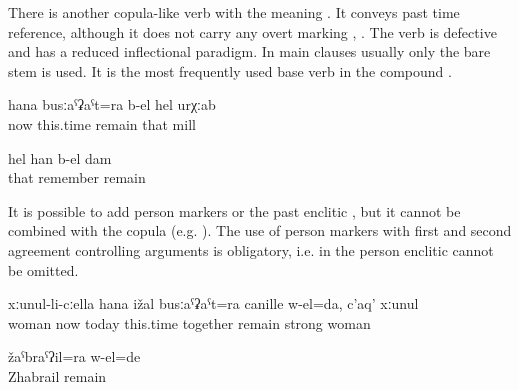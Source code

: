 There is another copula-like verb  with the meaning . It conveys past time reference, although it does not carry any overt marking , . The verb is defective and has a reduced inflectional paradigm. In main clauses usually only the bare stem is used. It is the most frequently used base verb in the compound  .
%
\begin{exe}
	\ex	\label{ex:Even nowadays that mill remained (i.e. is still there)}
	\gll	hana	busːaˁʡaˁt=ra	b-el	hel	urχːab\\
		now	this.time	remain	that	mill\\
	\glt	{}

	\ex	\label{ex:I remember this (i.e. it remained in my memory)}
	\gll	hel	han	b-el	dam\\
		that	remember	remain	\\
	\glt	{}
\end{exe}

It is possible to add person markers  or the past enclitic , but it cannot be combined with the copula (e.g. ). The use of person markers with first and second agreement controlling arguments is obligatory, i.e. in  the person enclitic  cannot be omitted.
%
\begin{exe}
	\ex	\label{ex:I stayed together with my wife even until today; a good (strong) woman}
	\gll	xːunul-li-cːella hana	ižal	busːaˁʡaˁt=ra	canille	w-el=da,	c'aq'	xːunul\\
		woman	now	today	this.time	together	remain		strong	woman\\
	\glt	{}

	\ex	\label{ex:Zhabrail remained}
	\gll	žaˁbraˁʔil=ra	w-el=de\\
		Zhabrail	remain\\
	\glt	{}
\end{exe}

